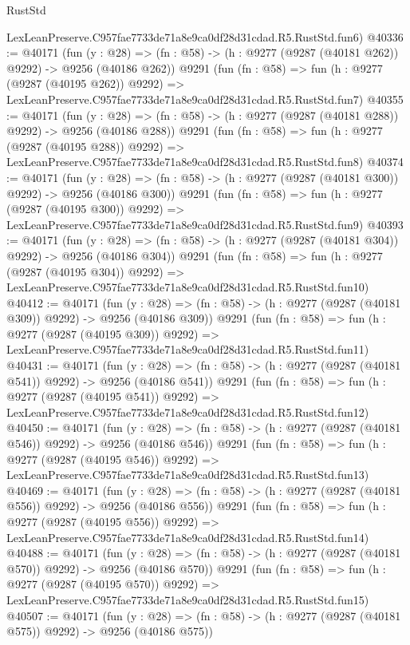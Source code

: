 \begin{lexlean}{RustStd}
\begin{coremodule}
    LexLeanPreserve.C957fae7733de71a8e9ca0df28d31cdad.R5.RustStd.fun6)
@40336 := @40171
    (fun (y : @28) => (fn : @58) -> (h : @9277 (@9287 (@40181 @262)) @9292) -> @9256 (@40186 @262))
    @9291
    (fun (fn : @58) =>
    fun (h : @9277 (@9287 (@40195 @262)) @9292) =>
    LexLeanPreserve.C957fae7733de71a8e9ca0df28d31cdad.R5.RustStd.fun7)
@40355 := @40171
    (fun (y : @28) => (fn : @58) -> (h : @9277 (@9287 (@40181 @288)) @9292) -> @9256 (@40186 @288))
    @9291
    (fun (fn : @58) =>
    fun (h : @9277 (@9287 (@40195 @288)) @9292) =>
    LexLeanPreserve.C957fae7733de71a8e9ca0df28d31cdad.R5.RustStd.fun8)
@40374 := @40171
    (fun (y : @28) => (fn : @58) -> (h : @9277 (@9287 (@40181 @300)) @9292) -> @9256 (@40186 @300))
    @9291
    (fun (fn : @58) =>
    fun (h : @9277 (@9287 (@40195 @300)) @9292) =>
    LexLeanPreserve.C957fae7733de71a8e9ca0df28d31cdad.R5.RustStd.fun9)
@40393 := @40171
    (fun (y : @28) => (fn : @58) -> (h : @9277 (@9287 (@40181 @304)) @9292) -> @9256 (@40186 @304))
    @9291
    (fun (fn : @58) =>
    fun (h : @9277 (@9287 (@40195 @304)) @9292) =>
    LexLeanPreserve.C957fae7733de71a8e9ca0df28d31cdad.R5.RustStd.fun10)
@40412 := @40171
    (fun (y : @28) => (fn : @58) -> (h : @9277 (@9287 (@40181 @309)) @9292) -> @9256 (@40186 @309))
    @9291
    (fun (fn : @58) =>
    fun (h : @9277 (@9287 (@40195 @309)) @9292) =>
    LexLeanPreserve.C957fae7733de71a8e9ca0df28d31cdad.R5.RustStd.fun11)
@40431 := @40171
    (fun (y : @28) => (fn : @58) -> (h : @9277 (@9287 (@40181 @541)) @9292) -> @9256 (@40186 @541))
    @9291
    (fun (fn : @58) =>
    fun (h : @9277 (@9287 (@40195 @541)) @9292) =>
    LexLeanPreserve.C957fae7733de71a8e9ca0df28d31cdad.R5.RustStd.fun12)
@40450 := @40171
    (fun (y : @28) => (fn : @58) -> (h : @9277 (@9287 (@40181 @546)) @9292) -> @9256 (@40186 @546))
    @9291
    (fun (fn : @58) =>
    fun (h : @9277 (@9287 (@40195 @546)) @9292) =>
    LexLeanPreserve.C957fae7733de71a8e9ca0df28d31cdad.R5.RustStd.fun13)
@40469 := @40171
    (fun (y : @28) => (fn : @58) -> (h : @9277 (@9287 (@40181 @556)) @9292) -> @9256 (@40186 @556))
    @9291
    (fun (fn : @58) =>
    fun (h : @9277 (@9287 (@40195 @556)) @9292) =>
    LexLeanPreserve.C957fae7733de71a8e9ca0df28d31cdad.R5.RustStd.fun14)
@40488 := @40171
    (fun (y : @28) => (fn : @58) -> (h : @9277 (@9287 (@40181 @570)) @9292) -> @9256 (@40186 @570))
    @9291
    (fun (fn : @58) =>
    fun (h : @9277 (@9287 (@40195 @570)) @9292) =>
    LexLeanPreserve.C957fae7733de71a8e9ca0df28d31cdad.R5.RustStd.fun15)
@40507 := @40171
    (fun (y : @28) => (fn : @58) -> (h : @9277 (@9287 (@40181 @575)) @9292) -> @9256 (@40186 @575))

\end{coremodule}
\end{lexlean}
